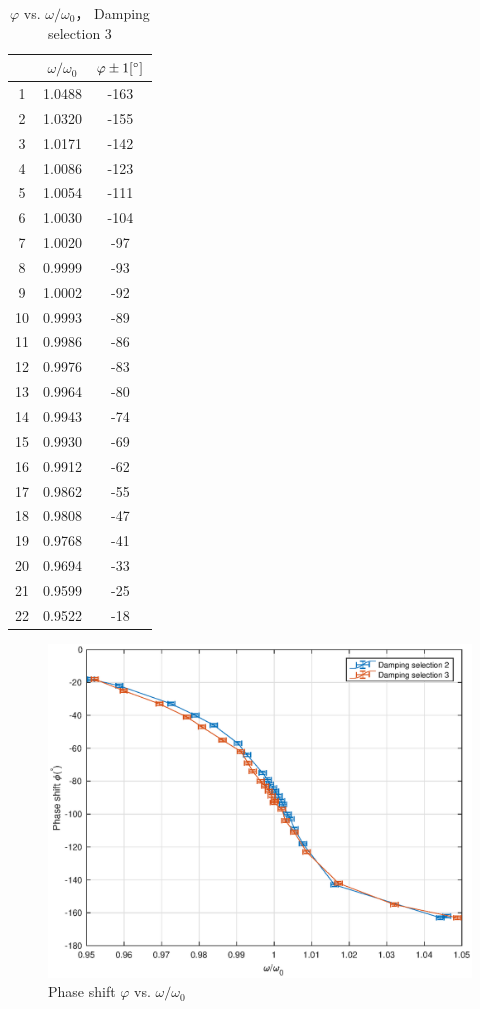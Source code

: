 \begin{table}[H]
\centering
\begin{tabular}{|c|c|c|}
\hline
& $\omega/\omega_0$ &  $\varphi \pm 1 [^\circ] $ \\ \hline
1  & 1.0488   & -163 \\ \hline
2  & 1.0320   & -155 \\ \hline
3  & 1.0171   & -142 \\ \hline
4  & 1.0086   & -123 \\ \hline
5  & 1.0054   & -111 \\ \hline
6  & 1.0030   & -104 \\ \hline
7  & 1.0020   &  -97 \\ \hline
8  & 0.9999   &  -93 \\ \hline
9  & 1.0002   &  -92 \\ \hline
10 & 0.9993   &  -89 \\ \hline
11 & 0.9986   &  -86 \\ \hline
12 & 0.9976   &  -83 \\ \hline
13 & 0.9964   &  -80 \\ \hline
14 & 0.9943   &  -74 \\ \hline
15 & 0.9930   &  -69 \\ \hline
16 & 0.9912   &  -62 \\ \hline
17 & 0.9862   &  -55 \\ \hline
18 & 0.9808   &  -47 \\ \hline
19 & 0.9768   &  -41 \\ \hline
20 & 0.9694   &  -33 \\ \hline
21 & 0.9599   &  -25 \\ \hline
22 & 0.9522   &  -18 \\ \hline
\end{tabular}    
\caption{$\varphi$ vs. $\omega/\omega_0$， Damping selection 3}\label{data_phi3}
\end{table}




\begin{figure}[H]
\centering
\includegraphics[width=1\textwidth]{matlab/p1}
\caption{Phase shift $\varphi$ vs. $\omega/\omega_0$}\label{phi}
\end{figure}



